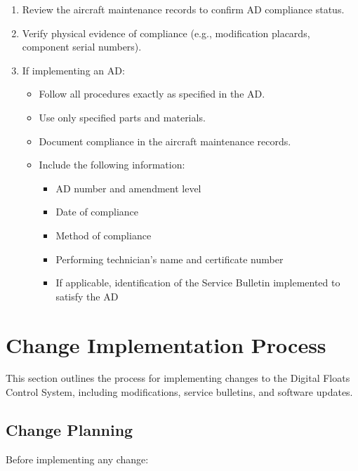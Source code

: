 \documentclass[12pt,a4paper,twoside,openright]{book}
\begin{document}
\begin{enumerate}
    \item Review the aircraft maintenance records to confirm AD compliance status.
    \item Verify physical evidence of compliance (e.g., modification placards, component serial numbers).
    \item If implementing an AD:
    \begin{itemize}
        \item Follow all procedures exactly as specified in the AD.
        \item Use only specified parts and materials.
        \item Document compliance in the aircraft maintenance records.
        \item Include the following information:
        \begin{itemize}
            \item AD number and amendment level
            \item Date of compliance
            \item Method of compliance
            \item Performing technician's name and certificate number
            \item If applicable, identification of the Service Bulletin implemented to satisfy the AD
        \end{itemize}
    \end{itemize}
\end{enumerate}

\section{Change Implementation Process}

This section outlines the process for implementing changes to the Digital Floats Control System, including modifications, service bulletins, and software updates.

\subsection{Change Planning}

Before implementing any change:
\end{document}
